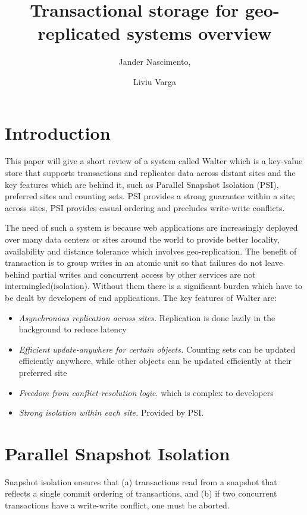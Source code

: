 \documentclass[a4paper]{article}
\begin{document}
\title{Transactional storage for geo-replicated systems overview}

\author{Jander Nascimento,
\and Liviu Varga}

\maketitle



\section{Introduction}
This paper will give a short review of a system called Walter which is a key-value store that supports transactions and replicates data across distant sites and the key features which are behind it, such as Parallel Snapshot Isolation (PSI), preferred sites and counting sets. PSI provides a strong guarantee within a site; across sites, PSI provides casual ordering and precludes write-write conflicts.

The need of such a system is because web applications are increasingly deployed over many data centers or sites around the world to provide better locality, availability and distance tolerance which involves geo-replication. The benefit of transaction is to group writes in an atomic unit so that failures do not leave behind partial writes and concurrent access by other services are not intermingled(isolation). Without them there is a significant burden which have to be dealt by developers of end applications. The key features of Walter are:
\begin{itemize}
\item \textit{Asynchronous replication across sites.} Replication is done lazily in the background to reduce latency
\item \textit{Efficient update-anywhere for certain objects.} Counting sets can be updated efficiently anywhere, while other objects can be updated efficiently at their preferred site
\item \textit{Freedom from conflict-resolution logic}. which is complex to developers
\item \textit{Strong isolation within each site.} Provided by PSI.
\end{itemize}
          
\section{Parallel Snapshot Isolation}
Snapshot isolation ensures that (a) transactions read from a snapshot that reflects a single commit ordering of transactions, and (b) if two concurrent transactions have a write-write conflict, one must be aborted.
 
\end{document}
